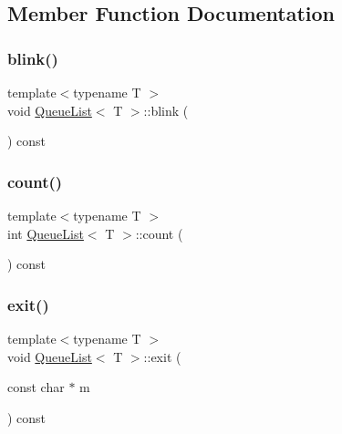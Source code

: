 \subsection{Member Function Documentation}
\mbox{\label{class_queue_list_aaae70e1aed37aca1dfbd59334d0f73fe}} 
\subsubsection{\texorpdfstring{blink()}{blink()}}
{\footnotesize\ttfamily template$<$typename T $>$ \\
void \mbox{\hyperlink{class_queue_list}{Queue\+List}}$<$ T $>$\+::blink (\begin{DoxyParamCaption}{ }\end{DoxyParamCaption}) const\hspace{0.3cm}{\ttfamily [private]}}

\mbox{\label{class_queue_list_a3e3f39c0736cd879330ec4f04e3de504}} 
\subsubsection{\texorpdfstring{count()}{count()}}
{\footnotesize\ttfamily template$<$typename T $>$ \\
int \mbox{\hyperlink{class_queue_list}{Queue\+List}}$<$ T $>$\+::count (\begin{DoxyParamCaption}{ }\end{DoxyParamCaption}) const}

\mbox{\label{class_queue_list_a898426929c28b3ef4029ac5f54d6d415}} 
\subsubsection{\texorpdfstring{exit()}{exit()}}
{\footnotesize\ttfamily template$<$typename T $>$ \\
void \mbox{\hyperlink{class_queue_list}{Queue\+List}}$<$ T $>$\+::exit (\begin{DoxyParamCaption}\item[{const char $\ast$}]{m }\end{DoxyParamCaption}) const\hspace{0.3cm}{\ttfamily [private]}}


